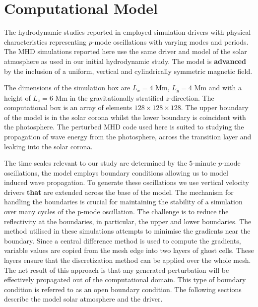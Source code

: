 \documentclass[physics,article,submit,pdftex,moreauthors]{Definitions/mdpi}
\begin{document}
\section{Computational Model}
The hydrodynamic studies reported in  \citet{Griffiths2018b} employed simulation drivers with physical characteristics representing $p$-mode oscillations with varying modes and periods. The MHD simulations reported here use the same driver and model of the solar atmosphere as used in our initial hydrodynamic study. The model is {\bf advanced} by the inclusion of a uniform, vertical and cylindrically symmetric magnetic field. 

 The dimensions of the simulation box are $L_{ x}= 4$ Mm,  $L_{y} =4$ Mm and with a height of $L_{z} =6$ Mm in the gravitationally stratified $z$-direction. The computational box is an array of elements $128 \times128 \times128 $. The upper boundary of the model is in the solar corona whilst the lower boundary is coincident with the photosphere. The perturbed MHD code used here is suited to studying the propagation of wave energy from the photosphere, across the transition layer and leaking into the solar corona. 
 
The time scales relevant to our study are determined by the 5-minute $p$-mode oscillations, the model employs boundary conditions allowing us to model induced wave propagation. To generate these oscillations we use vertical velocity drivers {\bf that} are extended across the base of the model. The mechanism for handling the boundaries is crucial for maintaining the stability of a simulation over many cycles of the p-mode oscillation. The challenge is to reduce the reflectivity at the boundaries, in particular, the upper and lower boundaries. The method utilised in these simulations attempts to minimise the gradients near the boundary. Since a central difference method is used to compute the gradients, variable values are copied from the mesh edge into two layers of ghost cells. These layers ensure that the discretization method can be applied over the whole mesh. The net result of this approach is that any generated perturbation will be effectively propagated out of the computational domain. This type of boundary condition is referred to as an open boundary condition. The following sections describe the model solar atmosphere and the driver.
\end{document}
